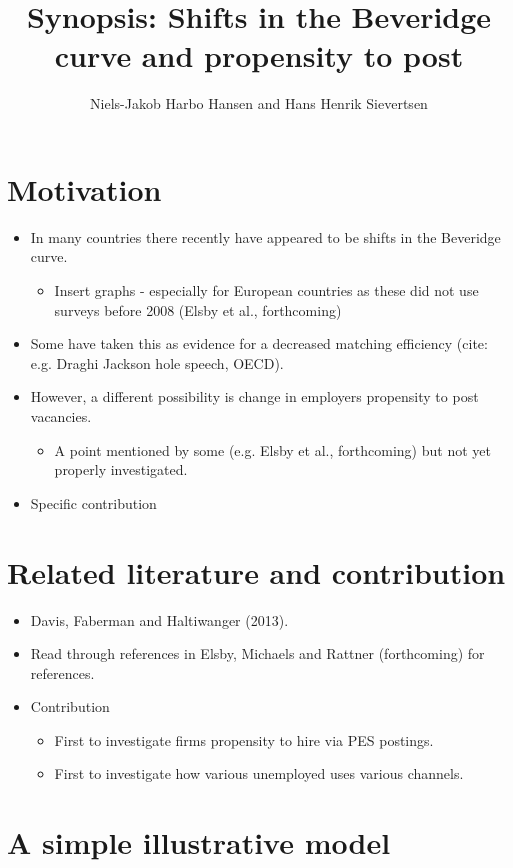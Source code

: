\documentclass{article}
\title{Synopsis: Shifts in the Beveridge curve and propensity to post}
\author{Niels-Jakob Harbo Hansen and Hans Henrik Sievertsen}
\begin{document}
\section{Motivation}

\begin{itemize}
	\item In many countries there recently have appeared to be shifts in the Beveridge curve. 
	\begin{itemize}
		\item Insert graphs - especially for European countries as these did not use surveys before 2008 (Elsby et al., forthcoming)
	\end{itemize}
	\item Some have taken this as evidence for a decreased matching efficiency (cite: e.g. Draghi Jackson hole speech, OECD).
	\item However, a different possibility is change in employers propensity to post vacancies.
	\begin{itemize}
		\item A point mentioned by some (e.g. Elsby et al., forthcoming) but not yet properly investigated.
	\end{itemize}
	\item Specific contribution
\end{itemize}

\section{Related literature and contribution}

\begin{itemize}
	\item Davis, Faberman and Haltiwanger (2013).
	\item Read through references in Elsby, Michaels and Rattner (forthcoming) for references.
	\item Contribution
	\begin{itemize}
	\item First to investigate firms propensity to hire via PES postings.
	\item First to investigate how various unemployed uses various channels.
	\end{itemize}
	
\end{itemize}

\section{A simple illustrative model}
\end{document}
